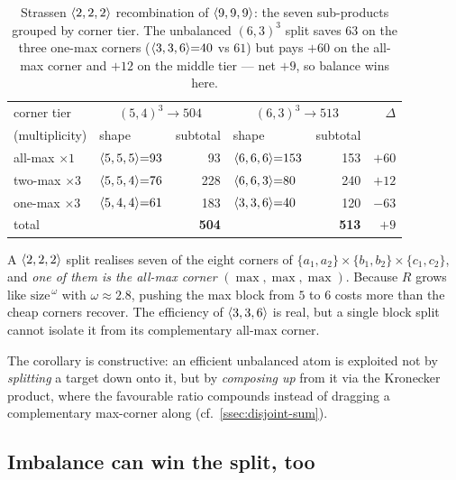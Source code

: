 \begin{table}[h]
\centering
\caption{Strassen \(\langle 2, 2, 2 \rangle\) recombination of
\(\langle 9, 9, 9 \rangle\): the seven sub-products grouped by corner tier. The
unbalanced \((6,3)^3\) split saves \(63\) on the three one-max corners
(\(\langle 3, 3, 6 \rangle{=}40\) vs \(61\)) but pays \(+60\) on the all-max corner
and \(+12\) on the middle tier --- net \(+9\), so balance wins here.}
\label{tab:9-faceoff}
\begin{tabular}{llrlrr}
\toprule
corner tier & \multicolumn{2}{c}{\((5,4)^3 \to 504\)} & \multicolumn{2}{c}{\((6,3)^3 \to 513\)} & \(\Delta\) \\
(multiplicity) & shape & subtotal & shape & subtotal & \\
\midrule
all-max \(\times 1\) & \(\langle 5, 5, 5 \rangle{=}93\)  & 93  & \(\langle 6, 6, 6 \rangle{=}153\) & 153 & \(+60\) \\
two-max \(\times 3\) & \(\langle 5, 5, 4 \rangle{=}76\)  & 228 & \(\langle 6, 6, 3 \rangle{=}80\)  & 240 & \(+12\) \\
one-max \(\times 3\) & \(\langle 5, 4, 4 \rangle{=}61\)  & 183 & \(\langle 3, 3, 6 \rangle{=}40\)  & 120 & \(-63\) \\
\midrule
total & & \textbf{504} & & \textbf{513} & \(+9\) \\
\bottomrule
\end{tabular}
\end{table}

A \(\langle 2, 2, 2 \rangle\) split realises seven of the eight corners of
\(\{a_1,a_2\}\times\{b_1,b_2\}\times\{c_1,c_2\}\), and \emph{one of them is the
all-max corner} \((\max,\max,\max)\). Because \(R\) grows like
\(\text{size}^{\,\omega}\) with \(\omega \approx 2.8\), pushing the max block
from \(5\) to \(6\) costs more than the cheap corners recover. The efficiency
of \(\langle 3, 3, 6 \rangle\) is real, but a single block split cannot isolate it
from its complementary all-max corner.

The corollary is constructive: an efficient unbalanced atom is exploited not by
\emph{splitting} a target down onto it, but by \emph{composing up} from it via
the Kronecker product, where the favourable ratio compounds instead of dragging
a complementary max-corner along (cf.~\ref{ssec:disjoint-sum}).

\subsection{Imbalance can win the split, too}
\label{ssec:imbalance-split-wins}

